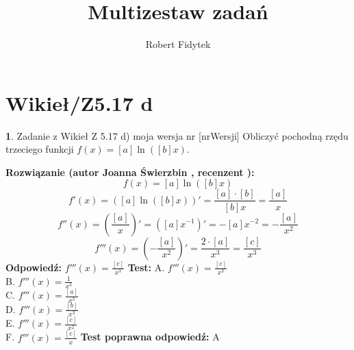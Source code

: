 \documentclass[12pt, a4paper]{article}
\title{Multizestaw zadań}
\author{Robert Fidytek}
\date{}
\theoremstyle{definition} %
\newtheorem{zad}{}
\newcommand{\kategoria}[1]{\section{#1}} %
\newcommand{\zadStart}[1]{\begin{zad}#1\newline} %
\newcommand{\zadStop}{\end{zad}}   %
\newcommand{\rozwStart}[2]{\noindent \textbf{Rozwiązanie (autor #1 , recenzent #2): }\newline} %
\newcommand{\rozwStop}{\newline}                                            %
\newcommand{\odpStart}{\noindent \textbf{Odpowiedź:}\newline}    %
\newcommand{\odpStop}{\newline}                                             %
\newcommand{\testStart}{\noindent \textbf{Test:}\newline} %
\newcommand{\testStop}{\newline} %
\newcommand{\kluczStart}{\noindent \textbf{Test poprawna odpowiedź:}\newline} %
\newcommand{\kluczStop}{\newline} %
\begin{document}
\maketitle


\kategoria{Wikieł/Z5.17 d}
\zadStart{Zadanie z Wikieł Z 5.17 d) moja wersja nr [nrWersji]}
Obliczyć pochodną rzędu trzeciego funkcji $f(x)=[a]\ln([b]x)$.
\zadStop
\rozwStart{Joanna Świerzbin}{}
$$f(x)=[a]\ln([b]x)$$
$$f'(x)= \left([a]\ln([b]x) \right)' = \frac{[a]\cdot[b]}{[b]x}=\frac{[a]}{x}$$
$$f''(x)= \left( \frac{[a]}{x} \right)'= \left( [a] x^{-1} \right)' = -[a] x^{-2} = -\frac{[a]}{x^2}$$
$$f'''(x)= \left( -\frac{[a]}{x^2} \right)'=\frac{2\cdot[a]}{x^3} =\frac{[c]}{x^3}  $$
\rozwStop
\odpStart
$f'''(x) = \frac{[c]}{x^3} $
\odpStop
\testStart
A. $f'''(x) = \frac{[c]}{x^3} $\\
B. $f'''(x) = \frac{1}{x^3} $ \\
C. $f'''(x) = \frac{[a]}{x^3} $\\
D. $f'''(x) = \frac{[b]}{x^3} $\\
E. $f'''(x) = \frac{[c]}{x^2} $\\
F. $f'''(x) = \frac{[c]}{x} $
\testStop
\kluczStart
A
\kluczStop
\end{document}
